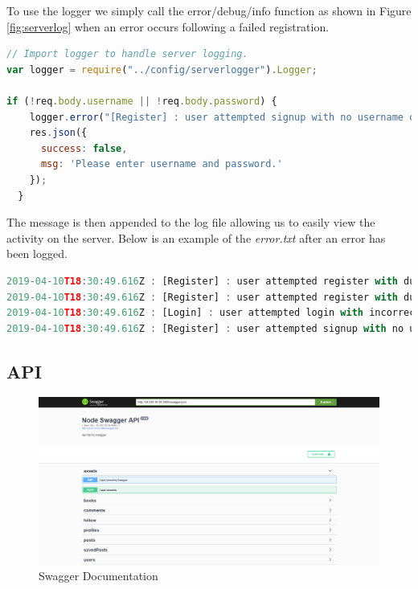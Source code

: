 To use the logger we simply call the error/debug/info function as shown in Figure \ref{fig:serverlog} when an error occurs following a failed registration.

\begin{lstlisting}[language=JAVASCRIPT,caption={Server Log call from API},captionpos=b,label={fig:serverlog}]
// Import logger to handle server logging. 
var logger = require("../config/serverlogger").Logger;

if (!req.body.username || !req.body.password) {
    logger.error("[Register] : user attempted signup with no username or password");
    res.json({
      success: false,
      msg: 'Please enter username and password.'
    });
  }
\end{lstlisting}

The message is then appended to the log file allowing us to easily view the activity on the server. Below is an example of the \textit{error.txt} after an error has been logged.

\begin{lstlisting}[language=JAVASCRIPT,caption={error.txt log file},captionpos=b,label={fig:errorlog}]
2019-04-10T18:30:49.616Z : [Register] : user attempted register with duplicate username
2019-04-10T18:30:49.616Z : [Register] : user attempted register with duplicate email
2019-04-10T18:30:49.616Z : [Login] : user attempted login with incorrect password
2019-04-10T18:30:49.616Z : [Register] : user attempted signup with no username or password
\end{lstlisting}

\subsection{API}
\begin{figure}[H]
  \includegraphics[width=\linewidth]{img/swaggerDoc.png}
  \caption{Swagger Documentation}
  \label{fig:swaggerDoc}
\end{figure}

